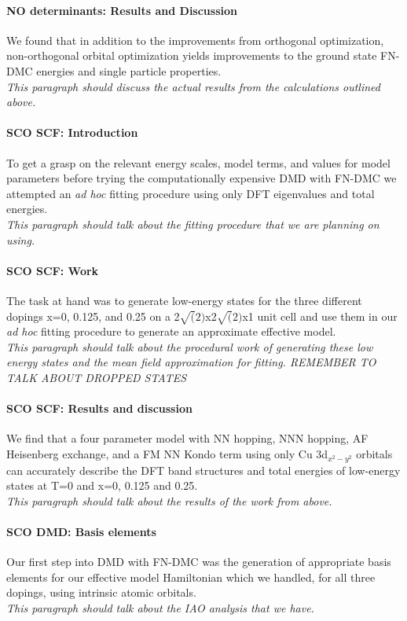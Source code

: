 \documentclass{article}
\begin{document}
\paragraph{NO determinants: Results and Discussion} We found that in addition to the improvements from orthogonal optimization, non-orthogonal orbital optimization yields improvements to the ground state FN-DMC energies and single particle properties.
\\
\textit{This paragraph should discuss the actual results from the calculations outlined above.}

\paragraph{SCO SCF: Introduction} To get a grasp on the relevant energy scales, model terms, and values for model parameters before trying the computationally expensive DMD with FN-DMC we attempted an \textit{ad hoc} fitting procedure using only DFT eigenvalues and total energies. 
\\
\textit{This paragraph should talk about the fitting procedure that we are planning on using.}

\paragraph{SCO SCF: Work} The task at hand was to generate low-energy states for the three different dopings x=0, 0.125, and 0.25 on a 2$\sqrt(2)$x2$\sqrt(2)$x1 unit cell and use them in our \textit{ad hoc} fitting procedure to generate an approximate effective model.
\\
\textit{This paragraph should talk about the procedural work of generating these low energy states and the mean field approximation for fitting. REMEMBER TO TALK ABOUT DROPPED STATES}

\paragraph{SCO SCF: Results and discussion} We find that a four parameter model with NN hopping, NNN hopping, AF Heisenberg exchange, and a FM NN Kondo term using only Cu 3d$_{x^2-y^2}$ orbitals can accurately describe the DFT band structures and total energies of low-energy states at T=0 and x=0, 0.125 and 0.25.
\\
\textit{This paragraph should talk about the results of the work from above.}

\paragraph{SCO DMD: Basis elements} Our first step into DMD with FN-DMC was the generation of appropriate basis elements for our effective model Hamiltonian which we handled, for all three dopings, using intrinsic atomic orbitals.
\\
\textit{This paragraph should talk about the IAO analysis that we have.}
\pagebreak
\end{document}
